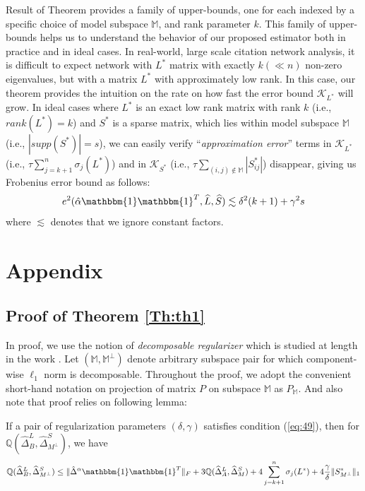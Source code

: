 \documentclass[AMS,STIX1COL]{WileyNJD-v2}
\begin{document}
Result of Theorem provides a family of upper-bounds, one for each indexed by a specific choice of model subspace $\mathbb{M}$, and rank parameter $k$. This family of upper-bounds helps us to understand the behavior of our proposed estimator both in practice and in ideal cases. In real-world, large scale citation network analysis, it is difficult to expect network with $L^*$ matrix with exactly $k(\ll n)$ non-zero eigenvalues, but with a matrix $L^*$ with approximately low rank.
In this case, our theorem provides the intuition on the rate on how fast the error bound $\mathcal{K}_{L^*}$ will grow.  
In ideal cases where $L^*$ is an exact low rank matrix with rank $k$ (i.e., $rank(L^*)=k$) and $S^*$ is a sparse matrix, which lies within model subspace $\mathbb{M}$ (i.e., $|supp(S^*)|=s$), we can easily verify ``\emph{approximation error}'' terms in $\mathcal{K}_{L^*}$ (i.e., $\tau\sum_{j=k+1}^{n}\sigma_j(L^*)$) and in $\mathcal{K}_{S^*}$ (i.e., $\tau\sum_{(i,j)\notin \mathbb{M}}|S_{ij}^*|$) disappear, giving us Frobenius error bound as follows:
\[
    e^{2}(\hat{\alpha}\mathbbm{1}\mathbbm{1}^T,\widehat{L},\widehat{S}) \lesssim \delta^2(k+1)+\gamma^2s
\]
where $\lesssim$ denotes that we ignore constant factors.

\section{Appendix}
\subsection{Proof of Theorem \ref{Th:th1}}

In proof, we use the notion of \emph{decomposable regularizer} which is studied at length in the work \cite{negahban2012unified}. Let $(\mathbb{M},\mathbb{M}^{\perp})$ denote arbitrary subspace pair for which component-wise $\ell_{1}$ norm is decomposable. Throughout the proof, we adopt the convenient short-hand notation on projection of matrix $P$ on subspace $\mathbb{M}$ as $P_{\mathbb{M}}$. And also note that proof relies on following lemma:

\begin{lemma} \label{le:le1}
If a pair of regularization parameters $(\delta,\gamma)$ satisfies condition (\ref{eq:49}), then for $\mathbb{Q}(\widehat{\Delta}^L_{B},\widehat{\Delta}^S_{M^\perp})$, we have
\[
    \mathbb{Q}(\widehat{\Delta}^L_{B},\widehat{\Delta}^S_{M^\perp}) \leq 
    \|\hat{\Delta}^{\alpha}\mathbbm{1}\mathbbm{1}^T\|_{F} + 
    3\mathbb{Q}(\widehat{\Delta}^{L}_{A},\widehat{\Delta}^{S}_{M})+4 \sum_{j=k+1}^{n} \sigma_{j}(L^{*}) + 4\frac{\gamma}{\delta}   
    \|S^{*}_{M^\perp}\|_{1}
\]
\end{lemma}
\end{document}
